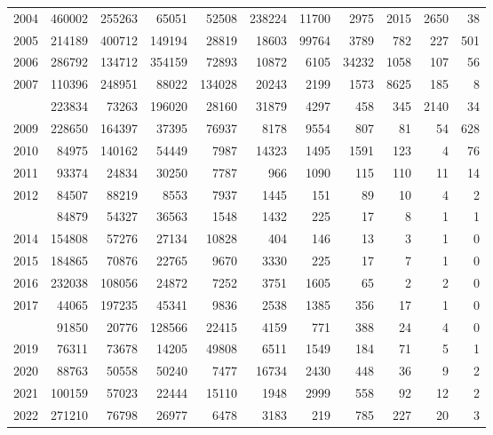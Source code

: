 \documentclass[
]{article}
\begin{document}
\begin{longtable}[t]{lrrrrrrrrrr}
2004 & 460002 & 255263 & 65051 & 52508 & 238224 & 11700 & 2975 & 2015 & 2650 & 38\\
2005 & 214189 & 400712 & 149194 & 28819 & 18603 & 99764 & 3789 & 782 & 227 & 501\\
2006 & 286792 & 134712 & 354159 & 72893 & 10872 & 6105 & 34232 & 1058 & 107 & 56\\
2007 & 110396 & 248951 & 88022 & 134028 & 20243 & 2199 & 1573 & 8625 & 185 & 8\\
\addlinespace
2008 & 223834 & 73263 & 196020 & 28160 & 31879 & 4297 & 458 & 345 & 2140 & 34\\
2009 & 228650 & 164397 & 37395 & 76937 & 8178 & 9554 & 807 & 81 & 54 & 628\\
2010 & 84975 & 140162 & 54449 & 7987 & 14323 & 1495 & 1591 & 123 & 4 & 76\\
2011 & 93374 & 24834 & 30250 & 7787 & 966 & 1090 & 115 & 110 & 11 & 14\\
2012 & 84507 & 88219 & 8553 & 7937 & 1445 & 151 & 89 & 10 & 4 & 2\\
\addlinespace
2013 & 84879 & 54327 & 36563 & 1548 & 1432 & 225 & 17 & 8 & 1 & 1\\
2014 & 154808 & 57276 & 27134 & 10828 & 404 & 146 & 13 & 3 & 1 & 0\\
2015 & 184865 & 70876 & 22765 & 9670 & 3330 & 225 & 17 & 7 & 1 & 0\\
2016 & 232038 & 108056 & 24872 & 7252 & 3751 & 1605 & 65 & 2 & 2 & 0\\
2017 & 44065 & 197235 & 45341 & 9836 & 2538 & 1385 & 356 & 17 & 1 & 0\\
\addlinespace
2018 & 91850 & 20776 & 128566 & 22415 & 4159 & 771 & 388 & 24 & 4 & 0\\
2019 & 76311 & 73678 & 14205 & 49808 & 6511 & 1549 & 184 & 71 & 5 & 1\\
2020 & 88763 & 50558 & 50240 & 7477 & 16734 & 2430 & 448 & 36 & 9 & 2\\
2021 & 100159 & 57023 & 22444 & 15110 & 1948 & 2999 & 558 & 92 & 12 & 2\\
2022 & 271210 & 76798 & 26977 & 6478 & 3183 & 219 & 785 & 227 & 20 & 3\\*
\end{longtable}
\end{document}
